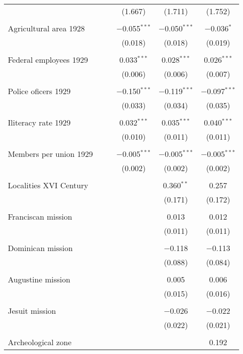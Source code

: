 \begin{table}[!htbp]
\begin{tabular}{@{\extracolsep{5pt}}lccccc}
  &  &  & (1.667) & (1.711) & (1.752) \\ 
  & & & & & \\ 
 Agricultural area 1928 &  &  & $-$0.055$^{***}$ & $-$0.050$^{***}$ & $-$0.036$^{*}$ \\ 
  &  &  & (0.018) & (0.018) & (0.019) \\ 
  & & & & & \\ 
 Federal employees 1929 &  &  & 0.033$^{***}$ & 0.028$^{***}$ & 0.026$^{***}$ \\ 
  &  &  & (0.006) & (0.006) & (0.007) \\ 
  & & & & & \\ 
 Police oficers 1929 &  &  & $-$0.150$^{***}$ & $-$0.119$^{***}$ & $-$0.097$^{***}$ \\ 
  &  &  & (0.033) & (0.034) & (0.035) \\ 
  & & & & & \\ 
 Iliteracy rate 1929 &  &  & 0.032$^{***}$ & 0.035$^{***}$ & 0.040$^{***}$ \\ 
  &  &  & (0.010) & (0.011) & (0.011) \\ 
  & & & & & \\ 
 Members per union 1929 &  &  & $-$0.005$^{***}$ & $-$0.005$^{***}$ & $-$0.005$^{***}$ \\ 
  &  &  & (0.002) & (0.002) & (0.002) \\ 
  & & & & & \\ 
 Localities XVI Century &  &  &  & 0.360$^{**}$ & 0.257 \\ 
  &  &  &  & (0.171) & (0.172) \\ 
  & & & & & \\ 
 Franciscan mission &  &  &  & 0.013 & 0.012 \\ 
  &  &  &  & (0.011) & (0.011) \\ 
  & & & & & \\ 
 Dominican mission &  &  &  & $-$0.118 & $-$0.113 \\ 
  &  &  &  & (0.088) & (0.084) \\ 
  & & & & & \\ 
 Augustine mission &  &  &  & 0.005 & 0.006 \\ 
  &  &  &  & (0.015) & (0.016) \\ 
  & & & & & \\ 
 Jesuit mission &  &  &  & $-$0.026 & $-$0.022 \\ 
  &  &  &  & (0.022) & (0.021) \\ 
  & & & & & \\ 
 Archeological zone &  &  &  &  & 0.192 \\ 

\end{tabular}
\end{table}
